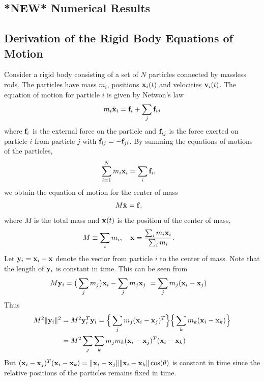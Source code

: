 \clearpage
\subsection{*NEW* Numerical Results}

\newcommand{\tableFont}{\small}




\clearpage
\subsection{Derivation of the Rigid Body Equations of Motion} \label{sec:rigidBodyDynamics}



Consider a rigid body consisting of a set of $N$ particles connected by massless rods.
The particles have mass $m_i$, positions $\mathbf{ x}_i(t)$ and velocities $\mathbf{ v}_i(t)$. The equation of motion
for particle $i$ is given by Netwon's law
\begin{align*}
    m_i \ddot {\mathbf{ x}}_i = \mathbf{ f}_i + \sum_j \mathbf{ f}_{ij}
\end{align*}
where $\mathbf{ f}_i$ is the external force on the particle and $\mathbf{ f}_{ij}$ is the force exerted 
on particle $i$ from particle $j$ with $\mathbf{ f}_{ij}=-\mathbf{ f}_{ji}$.
By summing the equations of motions of the particles,
\begin{align*}
    \sum_{i=1}^N m_i \ddot {\mathbf{ x}}_i &= \sum_i \mathbf{ f}_i,  
\end{align*}
we obtain the equation of motion for the center of mass
\begin{align*}
    M \ddot {\mathbf{ x}} & = \mathbf{ f}, 
\end{align*}
where $M$ is the total mass and $\mathbf{ x}(t)$ is the position of the center of mass, 
\begin{align*}
    M &\equiv \sum_i m_i, \quad
    \mathbf{ x} = \frac{\sum_i m_i \mathbf{ x}_i}{\sum_i m_i} .
\end{align*}
Let $\mathbf{ y}_i=\mathbf{ x}_i-\mathbf{ x}$ denote the vector from particle $i$ to the center of mass.
Note that the length of $\mathbf{ y}_i$ is constant in time. This can be seen 
from
\begin{align*}
    M \mathbf{ y}_i &= \big(\sum_j m_j\big) \mathbf{ x}_i - \sum_j m_j \mathbf{ x}_j ~= \sum_j m_j( \mathbf{ x}_i-\mathbf{ x}_j) 
\end{align*}
Thus 
\begin{align*}
  M^2  \| \mathbf{ y}_i \|^2 &= M^2 \mathbf{ y}_i^T \mathbf{ y}_i = \Big\{ \sum_j m_j( \mathbf{ x}_i-\mathbf{ x}_j)^T \Big\} \Big\{ \sum_k m_k( \mathbf{ x}_i-\mathbf{ x}_k) \Big\}  \\
         &= M^2 \sum_j \sum_k m_j m_k ( \mathbf{ x}_i-\mathbf{ x}_j)^T( \mathbf{ x}_i-\mathbf{ x}_k)
\end{align*}
But $( \mathbf{ x}_i-\mathbf{ x}_j)^T( \mathbf{ x}_i-\mathbf{ x}_k) =\| \mathbf{ x}_i-\mathbf{ x}_j\| \|  \mathbf{ x}_i-\mathbf{ x}_k\| \cos(\theta) $ is constant in time since
the relative positions of the particles remains fixed in time.

